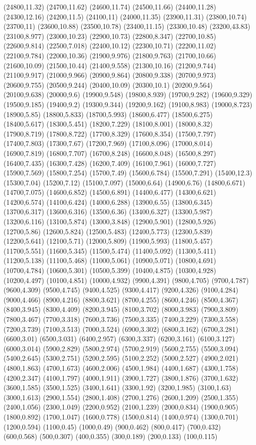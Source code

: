 (24800,11.32)
(24700,11.62)
(24600,11.74)
(24500,11.66)
(24400,11.28)
(24300,12.16)
(24200,11.5)
(24100,11)
(24000,11.35)
(23900,11.31)
(23800,10.74)
(23700,11)
(23600,10.88)
(23500,10.78)
(23400,11.15)
(23300,10.48)
(23200,43.83)
(23100,8.977)
(23000,10.23)
(22900,10.73)
(22800,8.347)
(22700,10.85)
(22600,9.814)
(22500,7.018)
(22400,10.12)
(22300,10.71)
(22200,11.02)
(22100,9.784)
(22000,10.36)
(21900,9.976)
(21800,9.763)
(21700,10.66)
(21600,10.09)
(21500,10.44)
(21400,9.558)
(21300,10.16)
(21200,9.744)
(21100,9.917)
(21000,9.966)
(20900,9.864)
(20800,9.338)
(20700,9.973)
(20600,9.755)
(20500,9.244)
(20400,10.09)
(20300,10.1)
(20200,9.564)
(20100,9.638)
(20000,9.6)
(19900,9.548)
(19800,8.939)
(19700,9.282)
(19600,9.329)
(19500,9.185)
(19400,9.2)
(19300,9.344)
(19200,9.162)
(19100,8.983)
(19000,8.723)
(18900,5.85)
(18800,5.833)
(18700,5.993)
(18600,6.477)
(18500,6.275)
(18400,5.617)
(18300,5.451)
(18200,7.229)
(18100,8.001)
(18000,8.32)
(17900,8.719)
(17800,8.722)
(17700,8.329)
(17600,8.354)
(17500,7.797)
(17400,7.803)
(17300,7.67)
(17200,7.969)
(17100,8.096)
(17000,8.014)
(16900,7.819)
(16800,7.707)
(16700,8.248)
(16600,8.048)
(16500,8.297)
(16400,7.435)
(16300,7.428)
(16200,7.409)
(16100,7.961)
(16000,7.727)
(15900,7.569)
(15800,7.254)
(15700,7.49)
(15600,6.784)
(15500,7.291)
(15400,12.3)
(15300,7.04)
(15200,7.12)
(15100,7.097)
(15000,6.64)
(14900,6.76)
(14800,6.671)
(14700,7.075)
(14600,6.852)
(14500,6.891)
(14400,6.477)
(14300,6.621)
(14200,6.574)
(14100,6.424)
(14000,6.288)
(13900,6.55)
(13800,6.345)
(13700,6.317)
(13600,6.316)
(13500,6.36)
(13400,6.327)
(13300,5.987)
(13200,6.116)
(13100,5.874)
(13000,3.848)
(12900,5.901)
(12800,5.926)
(12700,5.86)
(12600,5.824)
(12500,5.483)
(12400,5.773)
(12300,5.839)
(12200,5.641)
(12100,5.71)
(12000,5.809)
(11900,5.993)
(11800,5.457)
(11700,5.551)
(11600,5.345)
(11500,5.474)
(11400,5.092)
(11300,5.411)
(11200,5.138)
(11100,5.468)
(11000,5.061)
(10900,5.071)
(10800,4.691)
(10700,4.784)
(10600,5.301)
(10500,5.399)
(10400,4.875)
(10300,4.928)
(10200,4.497)
(10100,4.851)
(10000,4.932)
(9900,4.391)
(9800,4.705)
(9700,4.787)
(9600,4.309)
(9500,4.745)
(9400,4.525)
(9300,4.417)
(9200,4.326)
(9100,4.284)
(9000,4.466)
(8900,4.216)
(8800,3.621)
(8700,4.255)
(8600,4.246)
(8500,4.367)
(8400,3.945)
(8300,4.409)
(8200,3.945)
(8100,3.702)
(8000,3.983)
(7900,3.809)
(7800,3.467)
(7700,3.318)
(7600,3.736)
(7500,3.335)
(7400,3.229)
(7300,3.558)
(7200,3.739)
(7100,3.513)
(7000,3.524)
(6900,3.302)
(6800,3.162)
(6700,3.281)
(6600,3.01)
(6500,3.031)
(6400,2.957)
(6300,3.337)
(6200,3.161)
(6100,3.127)
(6000,3.014)
(5900,2.829)
(5800,2.974)
(5700,2.919)
(5600,2.755)
(5500,3.094)
(5400,2.645)
(5300,2.751)
(5200,2.595)
(5100,2.252)
(5000,2.527)
(4900,2.021)
(4800,1.863)
(4700,1.673)
(4600,2.006)
(4500,1.984)
(4400,1.687)
(4300,1.758)
(4200,2.347)
(4100,1.797)
(4000,1.911)
(3900,1.727)
(3800,1.876)
(3700,1.632)
(3600,1.585)
(3500,1.525)
(3400,1.641)
(3300,1.92)
(3200,1.985)
(3100,1.63)
(3000,1.613)
(2900,1.554)
(2800,1.408)
(2700,1.276)
(2600,1.209)
(2500,1.355)
(2400,1.056)
(2300,1.049)
(2200,0.952)
(2100,1.239)
(2000,0.834)
(1900,0.905)
(1800,0.892)
(1700,1.047)
(1600,0.778)
(1500,0.814)
(1400,0.974)
(1300,0.701)
(1200,0.594)
(1100,0.45)
(1000,0.49)
(900,0.462)
(800,0.417)
(700,0.432)
(600,0.568)
(500,0.307)
(400,0.355)
(300,0.189)
(200,0.133)
(100,0.115)
